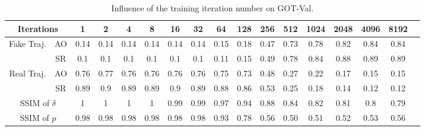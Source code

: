 \documentclass[journal]{IEEEtran}
\begin{document}
\begin{table}
  \centering
  \caption{Influence of the training iteration number on GOT-Val.}
  \begin{tabular}{cc|ccccccccccccccc} 
  \toprule
  \multicolumn{2}{c|}{Iterations}     & 1     & 2     & 4     & 8     & 16    & 32    & 64    & 128   & 256   & 512   & 1024  & 2048  & 4096  & 8192  \\ 
  \midrule
  \multirow{2}{*}{Fake Traj.} & AO    &  0.14 & 0.14 & 0.14 & 0.14 & 0.14 & 0.14 & 0.15 & 0.18 & 0.47 & 0.73 & 0.78 & 0.82 & 0.84 & 0.84  \\
                              & SR    &  0.1 & 0.1 & 0.1 & 0.1 & 0.1 & 0.1 & 0.11 & 0.15 & 0.49 & 0.78 & 0.84 & 0.88 & 0.89 & 0.89    \\ 
  \midrule
  \multirow{2}{*}{Real Traj.} & AO   & 0.76 & 0.77 & 0.76 & 0.76 & 0.76 & 0.76 & 0.75 & 0.73 & 0.48 & 0.27 & 0.22 & 0.17 & 0.15 & 0.15    \\
                              & SR   & 0.89 & 0.9 & 0.89 & 0.89 & 0.9 & 0.89 & 0.88 & 0.86 & 0.53 & 0.25 & 0.18 & 0.14 & 0.12 & 0.12    \\ 
  \midrule
  \multicolumn{2}{c|}{SSIM of $\delta$}&   1 & 1 & 1 & 1 & 0.99 & 0.99 & 0.97 & 0.94 & 0.88 & 0.84 & 0.82 & 0.81 & 0.8 & 0.79\\
  \midrule
  \multicolumn{2}{c|}{SSIM of $p$}      &  0.98 & 0.98 & 0.98 & 0.98 & 0.98 & 0.98 & 0.93 & 0.78 & 0.56 & 0.50 & 0.51 & 0.52 & 0.53 & 0.56\\
  \bottomrule
  \end{tabular}
  \label{tab:iter}
\end{table}
\end{document}
